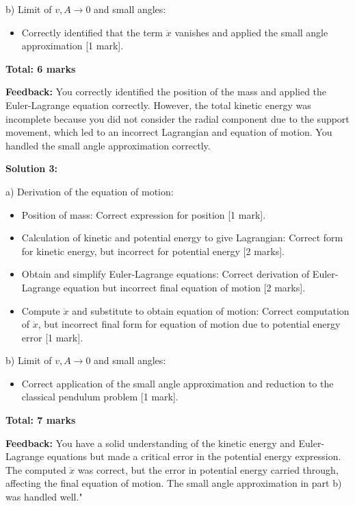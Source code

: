 \documentclass[a4paper,11pt]{article}
\begin{document}
b) Limit of \( v, A \rightarrow 0 \) and small angles:
\begin{itemize}
  \item Correctly identified that the term \( \ddot{x} \) vanishes and applied the small angle approximation [1 mark].
\end{itemize}

\textbf{Total: 6 marks}

\textbf{Feedback:}
You correctly identified the position of the mass and applied the Euler-Lagrange equation correctly. However, the total kinetic energy was incomplete because you did not consider the radial component due to the support movement, which led to an incorrect Lagrangian and equation of motion. You handled the small angle approximation correctly.

\textbf{Solution 3:}

a) Derivation of the equation of motion:
\begin{itemize}
  \item Position of mass: Correct expression for position [1 mark].
  \item Calculation of kinetic and potential energy to give Lagrangian: Correct form for kinetic energy, but incorrect for potential energy [2 marks].
  \item Obtain and simplify Euler-Lagrange equations: Correct derivation of Euler-Lagrange equation but incorrect final equation of motion [2 marks].
  \item Compute \( \ddot{x} \) and substitute to obtain equation of motion: Correct computation of \( \ddot{x} \), but incorrect final form for equation of motion due to potential energy error [1 mark].
\end{itemize}

b) Limit of \( v, A \rightarrow 0 \) and small angles:
\begin{itemize}
  \item Correct application of the small angle approximation and reduction to the classical pendulum problem [1 mark].
\end{itemize}

\textbf{Total: 7 marks}

\textbf{Feedback:}
You have a solid understanding of the kinetic energy and Euler-Lagrange equations but made a critical error in the potential energy expression. The computed \( \ddot{x} \) was correct, but the error in potential energy carried through, affecting the final equation of motion. The small angle approximation in part b) was handled well."
\end{document}
